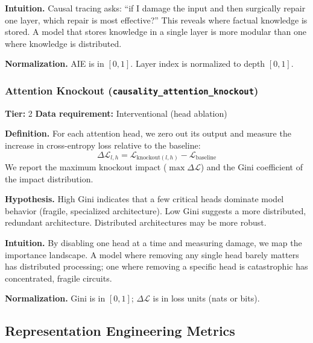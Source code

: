 \documentclass{article}
\begin{document}
\textbf{Intuition.}
Causal tracing asks: ``if I damage the input and then surgically repair one layer, which repair is most effective?'' This reveals where factual knowledge is stored. A model that stores knowledge in a single layer is more modular than one where knowledge is distributed.

\textbf{Normalization.} AIE is in $[0, 1]$. Layer index is normalized to depth $[0, 1]$.

\subsubsection{Attention Knockout (\texttt{causality\_attention\_knockout})}
\label{app:knockout}

\textbf{Tier:} 2 \quad \textbf{Data requirement:} Interventional (head ablation)

\textbf{Definition.}
For each attention head, we zero out its output and measure the increase in cross-entropy loss relative to the baseline:
\begin{equation}
  \Delta\mathcal{L}_{l,h} = \mathcal{L}_{\text{knockout}(l,h)} - \mathcal{L}_{\text{baseline}}
\end{equation}
We report the maximum knockout impact ($\max \Delta\mathcal{L}$) and the Gini coefficient of the impact distribution.

\textbf{Hypothesis.}
High Gini indicates that a few critical heads dominate model behavior (fragile, specialized architecture). Low Gini suggests a more distributed, redundant architecture. Distributed architectures may be more robust.

\textbf{Intuition.}
By disabling one head at a time and measuring damage, we map the importance landscape. A model where removing any single head barely matters has distributed processing; one where removing a specific head is catastrophic has concentrated, fragile circuits.

\textbf{Normalization.} Gini is in $[0, 1]$; $\Delta\mathcal{L}$ is in loss units (nats or bits).

\subsection{Representation Engineering Metrics}
\label{app:repe}

\end{document}

